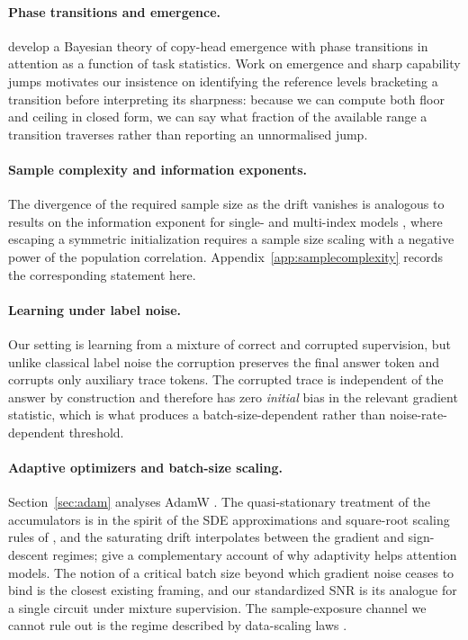 \documentclass{article}
\theoremstyle{plain}
\theoremstyle{definition}
\theoremstyle{remark}
\newcommand{\1}{\mathbf{1}}
\begin{document}
\paragraph{Phase transitions and emergence.}
\citet{lavie2026phase} develop a Bayesian theory of copy-head emergence with
phase transitions in attention as a function of task statistics. Work on
emergence and sharp capability jumps
\citep{wei2022emergent,schaeffer2023mirage} motivates our insistence on
identifying the reference levels bracketing a transition before interpreting its
sharpness: because we can compute both floor and ceiling in closed form, we can
say what fraction of the available range a transition traverses rather than
reporting an unnormalised jump.

\paragraph{Sample complexity and information exponents.}
The divergence of the required sample size as the drift vanishes is analogous to
results on the information exponent for single- and multi-index models
\citep{benarous2021online,damian2023smoothing,abbe2023sgd}, where escaping a
symmetric initialization requires a sample size scaling with a negative power of
the population correlation. Appendix~\ref{app:samplecomplexity} records the
corresponding statement here.

\paragraph{Learning under label noise.}
Our setting is learning from a mixture of correct and corrupted supervision, but
unlike classical label noise \citep{natarajan2013learning} the corruption
preserves the final answer token and corrupts only auxiliary trace tokens. The
corrupted trace is independent of the answer by construction and therefore has
zero \emph{initial} bias in the relevant gradient statistic, which is what
produces a batch-size-dependent rather than noise-rate-dependent threshold.

\paragraph{Adaptive optimizers and batch-size scaling.}
Section~\ref{sec:adam} analyses AdamW
\citep{kingma2015adam,loshchilov2019decoupled}. The quasi-stationary treatment of
the accumulators is in the spirit of the SDE approximations and square-root
scaling rules of \citet{malladi2022sdes}, and the saturating drift interpolates
between the gradient and sign-descent \citep{bernstein2018signsgd} regimes;
\citet{zhang2020adaptive} give a complementary account of why adaptivity helps
attention models. The notion of a critical batch size beyond which gradient noise
ceases to bind \citep{mccandlish2018empirical} is the closest existing framing,
and our standardized SNR is its analogue for a single circuit under mixture
supervision. The sample-exposure channel we cannot rule out is the regime
described by data-scaling laws \citep{kaplan2020scaling}.
\end{document}
